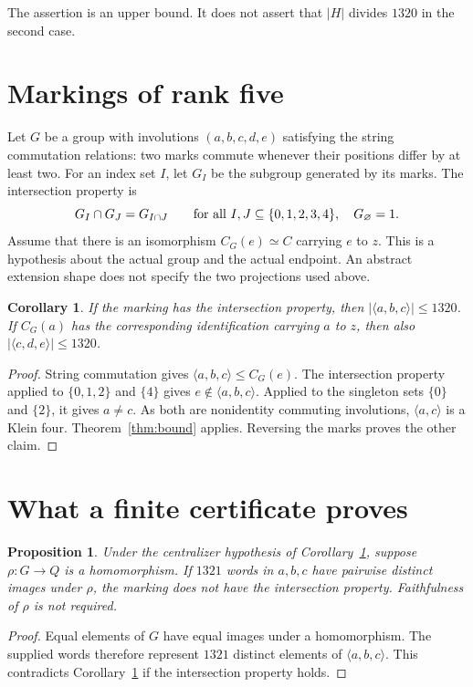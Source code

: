 \documentclass[11pt]{article}
\newtheorem{corollary}[theorem]{Corollary}
\newtheorem{proposition}[theorem]{Proposition}
\begin{document}
The assertion is an upper bound. It does not assert that $|H|$ divides
$1320$ in the second case.

\section{Markings of rank five}
Let $G$ be a group with involutions $(a,b,c,d,e)$ satisfying the string
commutation relations: two marks commute whenever their positions differ
by at least two. For an index set $I$, let $G_I$ be the subgroup generated
by its marks. The intersection property is
\[
 G_I\cap G_J=G_{I\cap J}\qquad\hbox{for all }I,J\subseteq\{0,1,2,3,4\},
 \quad G_\varnothing=1.
\]
Assume that there is an isomorphism $C_G(e)\simeq C$ carrying $e$ to $z$.
This is a hypothesis about the actual group and the actual endpoint.
An abstract extension shape does not specify the two projections used above.

\begin{corollary}\label{cor:rank5}
If the marking has the intersection property, then
$|\langle a,b,c\rangle|\leq1320$.
If $C_G(a)$ has the corresponding identification carrying $a$ to $z$,
then also $|\langle c,d,e\rangle|\leq1320$.
\end{corollary}
\begin{proof}
String commutation gives $\langle a,b,c\rangle\leq C_G(e)$.
The intersection property applied to $\{0,1,2\}$ and $\{4\}$ gives
$e\notin\langle a,b,c\rangle$. Applied to the singleton sets
$\{0\}$ and $\{2\}$, it gives $a\neq c$. As both are nonidentity
commuting involutions, $\langle a,c\rangle$ is a Klein four.
Theorem~\ref{thm:bound} applies. Reversing the marks proves the other claim.
\end{proof}

\section{What a finite certificate proves}
\begin{proposition}\label{prop:images}
Under the centralizer hypothesis of Corollary~\ref{cor:rank5}, suppose
$\rho:G\to Q$ is a homomorphism. If $1321$ words in $a,b,c$ have
pairwise distinct images under $\rho$, the marking does not have the
intersection property. Faithfulness of $\rho$ is not required.
\end{proposition}
\begin{proof}
Equal elements of $G$ have equal images under a homomorphism. The supplied
words therefore represent $1321$ distinct elements of $\langle a,b,c\rangle$.
This contradicts Corollary~\ref{cor:rank5} if the intersection property holds.
\end{proof}
\end{document}
